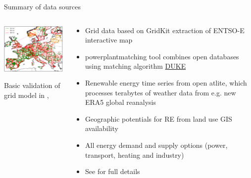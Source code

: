 \begin{frame}{Summary of data sources}
\begin{columns}[T]
\begin{column}{6cm}

  \vspace{0.3cm}
\centering

\includegraphics[width=7cm]{images/pypsa-eur-grid.png}

\vspace{.1cm}

Basic \alert{validation} of grid model in ,

\end{column}
\begin{column}{7.5cm}

  \begin{itemize}
    \item Grid data based on \alert{GridKit} extraction of ENTSO-E interactive map
    \item \alert{powerplantmatching} tool combines open databases using matching algorithm \href{https://github.com/larsga/Duke}{DUKE}
    \item Renewable energy time series from open \alert{atlite}, which processes terabytes of weather data from e.g. new ERA5 global reanalysis
    \item Geographic \alert{potentials} for RE from land use GIS availability
    \item All energy demand and supply options (power, transport, heating and industry)
      \item  See  for full details

  \end{itemize}
\end{column}
\end{columns}

\end{frame}


